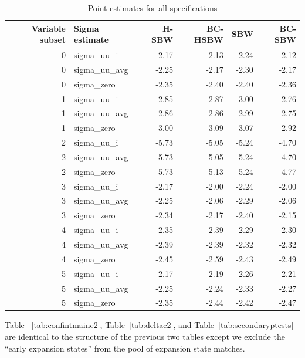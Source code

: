\begin{table}[ht]
\centering
\caption{Point estimates for all specifications}
\label{tab:ptests}
\begin{tabular}{rlrrrr}
  \toprule
Variable subset & Sigma estimate & H-SBW & BC-HSBW & SBW & BC-SBW \\ 
  \hline
0 & sigma\_uu\_i & -2.17 & -2.13 & -2.24 & -2.12 \\ 
  0 & sigma\_uu\_avg & -2.25 & -2.17 & -2.30 & -2.17 \\ 
  0 & sigma\_zero & -2.35 & -2.40 & -2.40 & -2.36 \\ 
  1 & sigma\_uu\_i & -2.85 & -2.87 & -3.00 & -2.76 \\ 
  1 & sigma\_uu\_avg & -2.86 & -2.86 & -2.99 & -2.75 \\ 
  1 & sigma\_zero & -3.00 & -3.09 & -3.07 & -2.92 \\ 
  2 & sigma\_uu\_i & -5.73 & -5.05 & -5.24 & -4.70 \\ 
  2 & sigma\_uu\_avg & -5.73 & -5.05 & -5.24 & -4.70 \\ 
  2 & sigma\_zero & -5.73 & -5.13 & -5.24 & -4.77 \\ 
  3 & sigma\_uu\_i & -2.17 & -2.00 & -2.24 & -2.00 \\ 
  3 & sigma\_uu\_avg & -2.25 & -2.06 & -2.29 & -2.06 \\ 
  3 & sigma\_zero & -2.34 & -2.17 & -2.40 & -2.15 \\ 
  4 & sigma\_uu\_i & -2.35 & -2.39 & -2.29 & -2.30 \\ 
  4 & sigma\_uu\_avg & -2.39 & -2.39 & -2.32 & -2.32 \\ 
  4 & sigma\_zero & -2.45 & -2.59 & -2.43 & -2.49 \\ 
  5 & sigma\_uu\_i & -2.17 & -2.19 & -2.26 & -2.21 \\ 
  5 & sigma\_uu\_avg & -2.25 & -2.24 & -2.33 & -2.27 \\ 
  5 & sigma\_zero & -2.35 & -2.44 & -2.42 & -2.47 \\ 
   \hline
\end{tabular}
\end{table}

Table ~\ref{tab:confintmainc2}, Table~\ref{tab:deltac2}, and Table~\ref{tab:secondaryptests} are identical to the structure of the previous two tables except we exclude the ``early expansion states'' from the pool of expansion state matches. 

